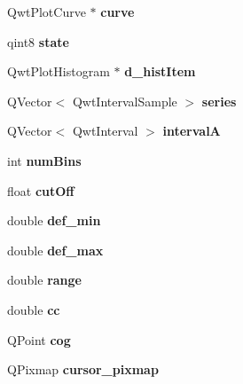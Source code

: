 \begin{DoxyCompactItemize}
Qwt\+Plot\+Curve $\ast$ {\bfseries curve}
\item 
\mbox{\label{classBarScreen_a760794dcf754291e8048d11b59f164c4}} 
qint8 {\bfseries state}
\item 
\mbox{\label{classBarScreen_ae1d1f7ad5265d8cab9cfb4508060d888}} 
Qwt\+Plot\+Histogram $\ast$ {\bfseries d\+\_\+hist\+Item}
\item 
\mbox{\label{classBarScreen_a0521180a30d14315bc7a98471d616392}} 
Q\+Vector$<$ Qwt\+Interval\+Sample $>$ {\bfseries series}
\item 
\mbox{\label{classBarScreen_a76549683ce4069172a98f3166a24cec7}} 
Q\+Vector$<$ Qwt\+Interval $>$ {\bfseries intervalA}
\item 
\mbox{\label{classBarScreen_a87fe5a37838e56362f08d5a58f60342f}} 
int {\bfseries num\+Bins}
\item 
\mbox{\label{classBarScreen_abeadea18d6006cdf5a0d0a8f4f757d8f}} 
float {\bfseries cut\+Off}
\item 
\mbox{\label{classBarScreen_ac4309c85d480f5a3d706082824983b66}} 
double {\bfseries def\+\_\+min}
\item 
\mbox{\label{classBarScreen_a84c112218b1ba0d4c1b7d1f686719f6a}} 
double {\bfseries def\+\_\+max}
\item 
\mbox{\label{classBarScreen_a3a27d451636712e1753eaf2db3f85f15}} 
double {\bfseries range}
\item 
\mbox{\label{classBarScreen_a2cb90ccb8dcd7b33d9080a449de15078}} 
double {\bfseries cc}
\item 
\mbox{\label{classBarScreen_ac8a4ecb5610b79c443fbcb6e062b57ff}} 
Q\+Point {\bfseries cog}
\item 
\mbox{\label{classBarScreen_a08aebf344206b301e0c33b6115e5c485}} 
Q\+Pixmap {\bfseries cursor\+\_\+pixmap}
\item 

\end{DoxyCompactItemize}
